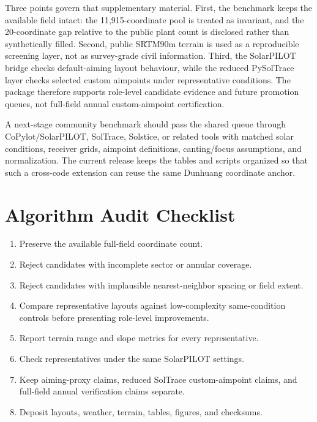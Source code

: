 \documentclass[final,3p,times]{elsarticle}
\begin{document}
Three points govern that supplementary material. First, the benchmark keeps the available field intact: the 11,915-coordinate pool is treated as invariant, and the 20-coordinate gap relative to the public plant count is disclosed rather than synthetically filled. Second, public SRTM90m terrain is used as a reproducible screening layer, not as survey-grade civil information. Third, the SolarPILOT bridge checks default-aiming layout behaviour, while the reduced PySolTrace layer checks selected custom aimpoints under representative conditions. The package therefore supports role-level candidate evidence and future promotion queues, not full-field annual custom-aimpoint certification.

A next-stage community benchmark should pass the shared queue through CoPylot/SolarPILOT, SolTrace, Solstice, or related tools with matched solar conditions, receiver grids, aimpoint definitions, canting/focus assumptions, and normalization. The current release keeps the tables and scripts organized so that such a cross-code extension can reuse the same Dunhuang coordinate anchor.

\iffalse
\section{Algorithm Audit Checklist}
\begin{enumerate}[leftmargin=*]
\item Preserve the available full-field coordinate count.
\item Reject candidates with incomplete sector or annular coverage.
\item Reject candidates with implausible nearest-neighbor spacing or field extent.
\item Compare representative layouts against low-complexity same-condition controls before presenting role-level improvements.
\item Report terrain range and slope metrics for every representative.
\item Check representatives under the same SolarPILOT settings.
\item Keep aiming-proxy claims, reduced SolTrace custom-aimpoint claims, and full-field annual verification claims separate.
\item Deposit layouts, weather, terrain, tables, figures, and checksums.
\end{enumerate}
\end{document}
